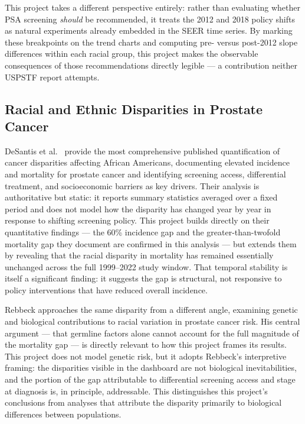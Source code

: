 This project takes a different perspective entirely: rather than evaluating whether
PSA screening \textit{should} be recommended, it treats the 2012 and 2018 policy
shifts as natural experiments already embedded in the SEER time series. By marking
these breakpoints on the trend charts and computing pre- versus post-2012 slope
differences within each racial group, this project makes the observable consequences
of those recommendations directly legible --- a contribution neither USPSTF report
attempts.

\subsection{Racial and Ethnic Disparities in Prostate Cancer}

DeSantis et al.\ \cite{desantis2019} provide the most comprehensive published
quantification of cancer disparities affecting African Americans, documenting
elevated incidence and mortality for prostate cancer and identifying screening
access, differential treatment, and socioeconomic barriers as key drivers. Their
analysis is authoritative but static: it reports summary statistics averaged over
a fixed period and does not model how the disparity has changed year by year in
response to shifting screening policy. This project builds directly on their
quantitative findings --- the 60\% incidence gap and the greater-than-twofold
mortality gap they document are confirmed in this analysis --- but extends them by
revealing that the racial disparity in mortality has remained essentially unchanged
across the full 1999--2022 study window. That temporal stability is itself a
significant finding: it suggests the gap is structural, not responsive to policy
interventions that have reduced overall incidence.

Rebbeck \cite{rebbeck2017} approaches the same disparity from a different angle,
examining genetic and biological contributions to racial variation in prostate cancer
risk. His central argument --- that germline factors alone cannot account for the
full magnitude of the mortality gap --- is directly relevant to how this project
frames its results. This project does not model genetic risk, but it adopts Rebbeck's
interpretive framing: the disparities visible in the dashboard are not biological
inevitabilities, and the portion of the gap attributable to differential screening
access and stage at diagnosis is, in principle, addressable. This distinguishes this
project's conclusions from analyses that attribute the disparity primarily to
biological differences between populations.

